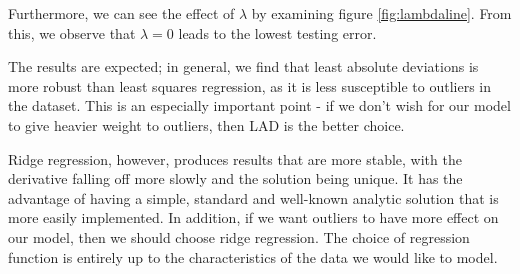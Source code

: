 \documentclass[10pt,letterpaper]{article}
\begin{document}
Furthermore, we can see the effect of $\lambda$ by examining figure \ref{fig:lambdaline}. From this, we observe that $\lambda=0$ leads to the lowest testing error.

The results are expected; in general, we find that least absolute deviations is more robust than least squares regression, as it is less susceptible to outliers in the dataset. This is an especially important point - if we don't wish for our model to give heavier weight to outliers, then LAD is the better choice.

Ridge regression, however, produces results that are more stable, with the derivative falling off more slowly and the solution being unique. It has the advantage of having a simple, standard and well-known analytic solution that is more easily implemented. In addition, if we want outliers to have more effect on our model, then we should choose ridge regression. The choice of regression function is entirely up to the characteristics of the data we would like to model.
\end{document}
